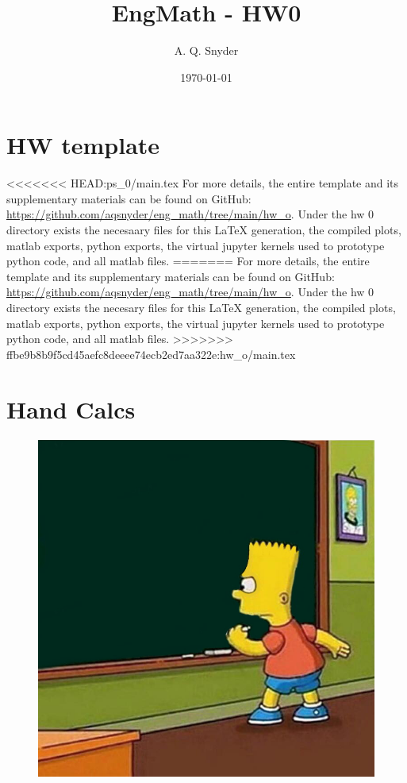\documentclass{article}
\begin{document}
\title{EngMath - HW0}
\author{A. Q. Snyder}
\date{\today}

\maketitle

\section{HW template}

\parbox{\textwidth}{
<<<<<<< HEAD:ps_0/main.tex
For more details, the entire template and its supplementary materials can be found on GitHub: \href{https://github.com/aqsnyder/eng_math/tree/main/ps_1}{https://github.com/aqsnyder/eng\_math/tree/main/hw\_o}.
Under the hw 0 directory exists the necesaary files for this LaTeX generation,  the compiled plots, matlab exports, python exports, the virtual jupyter kernels used to prototype python code, and all matlab files.
=======
For more details, the entire template and its supplementary materials can be found on GitHub: \href{https://github.com/aqsnyder/eng_math/tree/main/hw_o}{https://github.com/aqsnyder/eng\_math/tree/main/hw\_o}.
Under the hw 0 directory exists the necesary files for this LaTeX generation,  the compiled plots, matlab exports, python exports, the virtual jupyter kernels used to prototype python code, and all matlab files.
>>>>>>> ffbe9b8b9f5cd45aefc8deeee74ecb2ed7aa322e:hw_o/main.tex
}

\section{Hand Calcs}
\begin{figure}[h]
    \centering
    \includegraphics[width=1\textwidth]{hand-calcs.jpg}
\end{figure}
\end{document}
